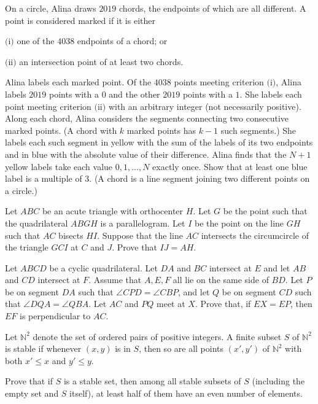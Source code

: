 \documentclass[11pt]{scrartcl}
\begin{document}
\begin{problem}[2210005554575274405]
On a circle, Alina draws $2019$ chords, the endpoints of which are all different. A point is considered marked if it is either

$\text{(i)}$ one of the $4038$ endpoints of a chord; or

$\text{(ii)}$ an intersection point of at least two chords.

Alina labels each marked point. Of the $4038$ points meeting criterion $\text{(i)}$, Alina labels $2019$ points with a $0$ and the other $2019$ points with a $1$. She labels each point meeting criterion $\text{(ii)}$ with an arbitrary integer (not necessarily positive).
Along each chord, Alina considers the segments connecting two consecutive marked points. (A chord with $k$ marked points has $k-1$ such segments.) She labels each such segment in yellow with the sum of the labels of its two endpoints and in blue with the absolute value of their difference.
Alina finds that the $N + 1$ yellow labels take each value $0, 1, . . . , N$ exactly once. Show that at least one blue label is a multiple of $3$.
(A chord is a line segment joining two different points on a circle.)
\end{problem}
\begin{problem}[236181624113090]
	Let $ABC$ be an acute triangle with orthocenter $H$. Let $G$ be the point such that the quadrilateral $ABGH$ is a parallelogram. Let $I$ be the point on the line $GH$ such that $AC$ bisects $HI$. Suppose that the line $AC$ intersects the circumcircle of the triangle $GCI$ at $C$ and $J$. Prove that $IJ = AH$.
\end{problem}
\begin{problem}[3353450172272500341]
Let $ABCD$ be a cyclic quadrilateral. Let $DA$ and $BC$ intersect at $E$ and let $AB$ and $CD$
intersect at $F$. Assume that $A, E, F$ all lie on the same side of $BD$. Let $P$ be on segment $DA$
such that $\angle CPD = \angle CBP$, and let $Q$ be on segment $CD$ such that $\angle DQA = \angle QBA$. Let $AC$ and $PQ$ meet at $X$. Prove that, if $EX = EP$, then $EF$ is perpendicular to $AC$.
\end{problem}
\begin{problem}[645930596871591]
Let $\mathbb{N}^2$ denote the set of ordered pairs of positive integers. A finite subset $S$ of $\mathbb{N}^2$ is stable if whenever $(x,y)$ is in $S$, then so are all points $(x',y')$ of $\mathbb{N}^2$ with both $x'\leq x$ and $y'\leq y$.

Prove that if $S$ is a stable set, then among all stable subsets of $S$ (including the empty set and $S$ itself), at least half of them have an even number of elements.
\end{problem}
\end{document}
